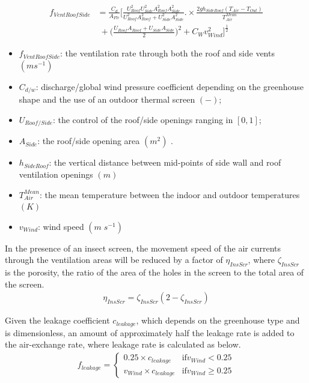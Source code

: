 \documentclass[a4paper]{article}
\numberwithin{equation}{section}
\begin{document}
\begin{equation} \label{eq:vent_roof_side}
  \begin{split}
    f_{VentRoofSide} & = \frac{C_d}{A_{Flr}} \Bigg[\frac{U^2_{Roof} U^2_{Side} A^2_{Roof} A^2_{Side}}{U^2_{Roof} A^2_{Roof} + U^2_{Side} A^2_{Side}} .\times \frac{2gh_{SideRoof} (T_{Air} - T_{Out})}{T^{Mean}_{Air}} \\
    &\;+ \Bigg(\frac{U_{Roof} A_{Roof} + U_{Side} A_{Side}}{2}\Bigg)^2 + C_W v^2_{Wind} \Bigg]^{\frac{1}{2}}
  \end{split}
\end{equation}
\begin{itemize}
  \item  \(f_{VentRoofSide} \): the ventilation rate through both the roof and side vents \((m s^{-1})\)
  \item  \( C_{d/w}\): discharge/global wind pressure coefficient depending on the greenhouse shape and the use of an outdoor thermal screen \((-)\);
  \item  \(U_{Roof/Side} \): the control of the roof/side openings ranging in \([0,1]\);
  \item  \( A_{Side}\): the roof/side opening area \((m^2)\) .
  \item  \(h_{SideRoof}\): the vertical distance between mid-points of side wall and roof ventilation openings \((m)\)
  \item  \(T^{Mean}_{Air} \): the mean temperature between the indoor and outdoor temperatures \((K)\)
  \item \(v_{Wind} \): wind speed \((m\;s^{-1})\)
\end{itemize}

In the presence of an insect screen, the movement speed of the air currents through the ventilation areas will be reduced by a factor of \(\eta_{InsScr}\), where \(\zeta_{InsScr}\) is the porosity, the ratio of the area of the holes in the screen to the total area of the screen.
\begin{gather}
  \eta_{InsScr} = \zeta_{InsScr} (2 -  \zeta_{InsScr})
\end{gather}

Given the leakage coefficient \(c_{leakage}\), which depends on the greenhouse type and is dimensionless, an amount of approximately half the leakage rate is added to the air-exchange rate, where leakage rate is calculated as below.
\begin{gather}
  f_{leakage} = \begin{cases}
    0.25 \times c_{leakage}     & \text{if} v_{Wind} < 0.25    \\
    v_{Wind} \times c_{leakage} & \text{if} v_{Wind} \geq 0.25
  \end{cases}
\end{gather}
\end{document}
